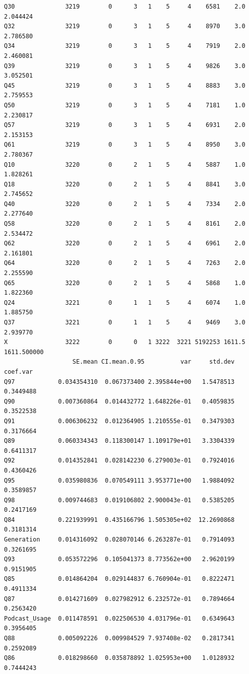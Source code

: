 \documentclass[
]{report}
\begin{document}
\begin{verbatim}
Q30              3219        0      3   1    5     4    6581    2.0    2.044424
Q32              3219        0      3   1    5     4    8970    3.0    2.786580
Q34              3219        0      3   1    5     4    7919    2.0    2.460081
Q39              3219        0      3   1    5     4    9826    3.0    3.052501
Q45              3219        0      3   1    5     4    8883    3.0    2.759553
Q50              3219        0      3   1    5     4    7181    1.0    2.230817
Q57              3219        0      3   1    5     4    6931    2.0    2.153153
Q61              3219        0      3   1    5     4    8950    3.0    2.780367
Q10              3220        0      2   1    5     4    5887    1.0    1.828261
Q18              3220        0      2   1    5     4    8841    3.0    2.745652
Q40              3220        0      2   1    5     4    7334    2.0    2.277640
Q58              3220        0      2   1    5     4    8161    2.0    2.534472
Q62              3220        0      2   1    5     4    6961    2.0    2.161801
Q64              3220        0      2   1    5     4    7263    2.0    2.255590
Q65              3220        0      2   1    5     4    5868    1.0    1.822360
Q24              3221        0      1   1    5     4    6074    1.0    1.885750
Q37              3221        0      1   1    5     4    9469    3.0    2.939770
X                3222        0      0   1 3222  3221 5192253 1611.5 1611.500000
                   SE.mean CI.mean.0.95          var     std.dev  coef.var
Q97            0.034354310  0.067373400 2.395844e+00   1.5478513 0.3449488
Q90            0.007360864  0.014432772 1.648226e-01   0.4059835 0.3522538
Q91            0.006306232  0.012364905 1.210555e-01   0.3479303 0.3176664
Q89            0.060334343  0.118300147 1.109179e+01   3.3304339 0.6411317
Q92            0.014352841  0.028142230 6.279003e-01   0.7924016 0.4360426
Q95            0.035980836  0.070549111 3.953771e+00   1.9884092 0.3589857
Q98            0.009744683  0.019106802 2.900043e-01   0.5385205 0.2417169
Q84            0.221939991  0.435166796 1.505305e+02  12.2690868 0.3181314
Generation     0.014316092  0.028070146 6.263287e-01   0.7914093 0.3261695
Q93            0.053572296  0.105041373 8.773562e+00   2.9620199 0.9151905
Q85            0.014864204  0.029144837 6.760904e-01   0.8222471 0.4911334
Q87            0.014271609  0.027982912 6.232572e-01   0.7894664 0.2563420
Podcast_Usage  0.011478591  0.022506530 4.031796e-01   0.6349643 0.3956405
Q88            0.005092226  0.009984529 7.937408e-02   0.2817341 0.2592089
Q86            0.018298660  0.035878892 1.025953e+00   1.0128932 0.7444243

\end{verbatim}
\end{document}
